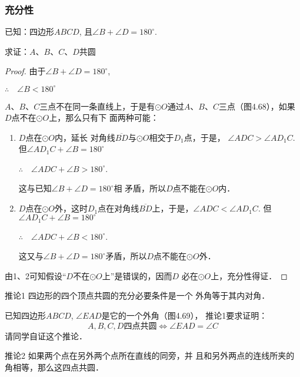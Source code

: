 \subsubsection{充分性}
已知：四边形$ABCD$, 且$\angle B+\angle D=180^{\circ}$.

求证：$A$、$B$、$C$、$D$共圆

\begin{proof}
  由于$\angle B+\angle D=180^{\circ}$,

$\therefore\quad \angle B <180^{\circ}$

$A$、$B$、$C$三点不在同一条直线上，于是有$\odot O$通过$A$、$B$、$C$三点（图4.68），如果$D$点不在$\odot O$上，那么只有下
面两种可能：
\begin{enumerate}
  \item $D$点在$\odot O$内，延长
  对角线$\overline{BD}$与$\odot O$相交于$D_1$点，于是，
  $\angle ADC>\angle AD_1C$. 
  但$\angle AD_1C+\angle B=180^{\circ}$
 
$\therefore\quad \angle ADC+\angle B>180^{\circ}$. 

这与已知$\angle B+\angle D=180^{\circ}$相
  矛盾，所以$D$点不能在$\odot O$内．
\item $D$点在$\odot O$外，这时$D_1$点在对角线$\overline{BD}$上，于是，$\angle ADC<\angle AD_1C$. 
  但$\angle AD_1C+\angle B=180^{\circ}$

$\therefore\quad \angle ADC+\angle B<180^{\circ}$.

  这又与$\angle B+\angle D=180^{\circ}$矛盾，所以$D$点不能在$\odot O$外．
\end{enumerate}

由1、2可知假设“$D$不在$\odot O$上”是错误的，因而$D$
  必在$\odot O$上，充分性得证．
\end{proof}

\begin{blk}
  {推论1} 四边形的四个顶点共圆的充分必要条件是一个
外角等于其内对角．
\end{blk}

已知四边形$ABCD$, $\angle EAD$是它的一个外角（图4.69），
推论1要求证明：
\[A,B,C,D\text{四点共圆}\Longleftrightarrow\angle EAD=\angle C\]
请同学自证这个推论．

\begin{blk}
  {推论2} 如果两个点在另外两个点所在直线的同旁，并
且和另外两点的连线所夹的角相等，那么这四点共圆．
\end{blk}


